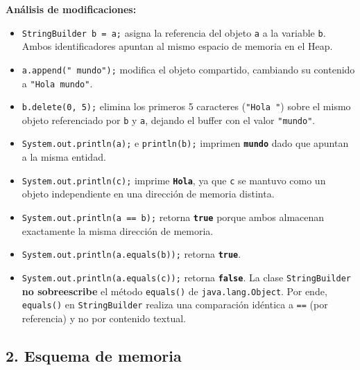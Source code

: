 \documentclass{article}
\begin{document}
\textbf{Análisis de modificaciones:}
\begin{itemize}
    \item \texttt{StringBuilder b = a;} asigna la referencia del objeto \texttt{a} a la variable \texttt{b}. Ambos identificadores apuntan al mismo espacio de memoria en el Heap.
    \item \texttt{a.append(" mundo");} modifica el objeto compartido, cambiando su contenido a \texttt{"Hola mundo"}.
    \item \texttt{b.delete(0, 5);} elimina los primeros 5 caracteres (\texttt{"Hola "}) sobre el mismo objeto referenciado por \texttt{b} y \texttt{a}, dejando el buffer con el valor \texttt{"mundo"}.
    \item \texttt{System.out.println(a);} e \texttt{println(b);} imprimen \textbf{\texttt{mundo}} dado que apuntan a la misma entidad.
    \item \texttt{System.out.println(c);} imprime \textbf{\texttt{Hola}}, ya que \texttt{c} se mantuvo como un objeto independiente en una dirección de memoria distinta.
    \item \texttt{System.out.println(a == b);} retorna \textbf{\texttt{true}} porque ambos almacenan exactamente la misma dirección de memoria.
    \item \texttt{System.out.println(a.equals(b));} retorna \textbf{\texttt{true}}.
    \item \texttt{System.out.println(a.equals(c));} retorna \textbf{\texttt{false}}. La clase \texttt{StringBuilder} \textbf{no sobreescribe} el método \texttt{equals()} de \texttt{java.lang.Object}. Por ende, \texttt{equals()} en \texttt{StringBuilder} realiza una comparación idéntica a \texttt{==} (por referencia) y no por contenido textual.
\end{itemize}

\subsection*{2. Esquema de memoria}
\end{document}
